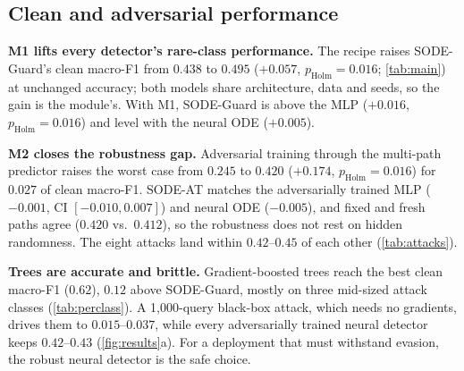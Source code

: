 \documentclass{article}
\theoremstyle{definition}
\begin{document}
\subsection{Clean and adversarial performance}
\textbf{M1 lifts every detector's rare-class performance.} The recipe raises
SODE-Guard's clean macro-F1 from $0.438$ to $0.495$ ($+0.057$,
$p_{\mathrm{Holm}}=0.016$; \cref{tab:main}) at unchanged accuracy; both models share
architecture, data and seeds, so the gain is the module's. With M1, SODE-Guard is above the MLP ($+0.016$,
$p_{\mathrm{Holm}}=0.016$) and level with the neural ODE ($+0.005$).

\textbf{M2 closes the robustness gap.} Adversarial training through the
multi-path predictor raises the worst case from $0.245$ to $0.420$ ($+0.174$,
$p_{\mathrm{Holm}}=0.016$) for $0.027$ of clean macro-F1. SODE-AT matches the
adversarially trained MLP ($-0.001$, CI $[-0.010,0.007]$) and neural ODE
($-0.005$), and fixed and fresh paths agree ($0.420$ vs.\ $0.412$), so the
robustness does not rest on hidden randomness. The eight attacks land within
$0.42$--$0.45$ of each other (\cref{tab:attacks}).

\textbf{Trees are accurate and brittle.} Gradient-boosted trees reach the best
clean macro-F1 ($0.62$), $0.12$ above SODE-Guard, mostly on three mid-sized
attack classes (\cref{tab:perclass}). A 1{,}000-query black-box attack, which
needs no gradients, drives them to $0.015$--$0.037$, while every adversarially
trained neural detector keeps $0.42$--$0.43$ (\cref{fig:results}a). For a
deployment that must withstand evasion, the robust neural detector is the safe
choice.
\end{document}
